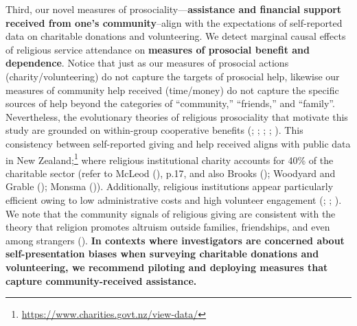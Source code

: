 \documentclass[
  single column]{article}
\begin{document}
Third, our novel measures of prosociality---\textbf{assistance and
financial support received from one's community}--align with the
expectations of self-reported data on charitable donations and
volunteering. We detect marginal causal effects of religious service
attendance on \textbf{measures of prosocial benefit and dependence}.
Notice that just as our measures of prosocial actions
(charity/volunteering) do not capture the targets of prosocial help,
likewise our measures of community help received (time/money) do not
capture the specific sources of help beyond the categories of
``community,'' ``friends,'' and ``family''. Nevertheless, the
evolutionary theories of religious prosociality that motivate this study
are grounded on within-group cooperative benefits
(;
;
;
;
). This
consistency between self-reported giving and help received aligns with
public data in New Zealand;\footnote{\url{https://www.charities.govt.nz/view-data/}}
where religious institutional charity accounts for 40\% of the
charitable sector (refer to McLeod (),
p.17, and also Brooks (); Woodyard
and Grable (); Monsma
()). Additionally, religious
institutions appear particularly efficient owing to low administrative
costs and high volunteer engagement
(;
;
). We note that the community
signals of religious giving are consistent with the theory that religion
promotes altruism outside families, friendships, and even among
strangers ().
\textbf{In contexts where investigators are concerned about
self-presentation biases when surveying charitable donations and
volunteering, we recommend piloting and deploying measures that capture
community-received assistance.}
\end{document}
